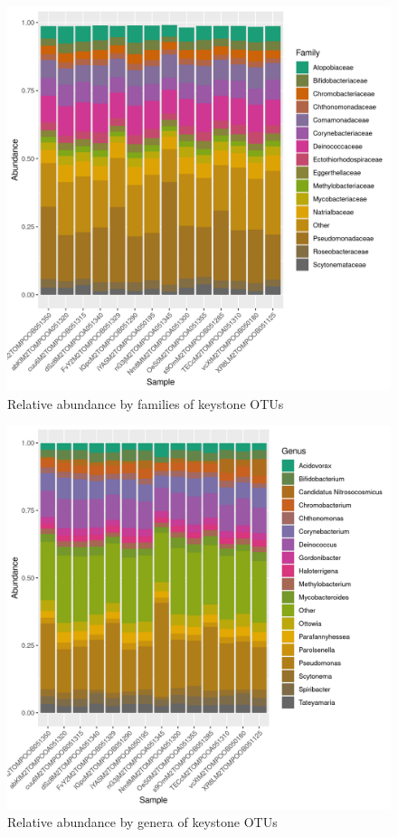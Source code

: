 \begin{figure}
\centering
\includegraphics[scale = 0.8]{tomate_desarrollo.csv_relative_abundance_Family.png}
\caption{Relative abundance by families of keystone OTUs }
\label{fig:tomate_desarrollo.csv_family}
\end{figure}
\begin{figure}
\centering
\includegraphics[scale = 0.8]{tomate_desarrollo.csv_relative_abundance_Genus.png}
\caption{Relative abundance by genera of keystone OTUs }
\label{fig:tomate_desarrollo.csv_genus}
\end{figure}
